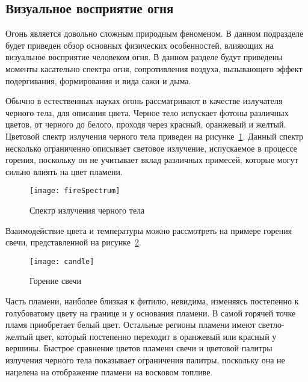 \subsection{Визуальное восприятие огня}%
\label{section:firePerception}

Огонь является довольно сложным природным феноменом. В данном подразделе будет
приведен обзор основных физических особенностей, влияющих на визуальное
восприятие человеком огня. В данном разделе будут приведены моменты касательно
спектра огня, сопротивления воздуха, вызывающего эффект подергивания,
формирования и вида сажи и дыма.

Обычно в естественных науках огонь рассматривают в качестве излучателя черного
тела, для описания цвета. Черное тело испускает фотоны различных цветов, от
черного до белого, проходя через красный, оранжевый и желтый. Цветовой спектр
излучения черного тела приведен на рисунке~\ref{fig:fireSpectrum}. Данный спектр
несколько ограниченно описывает световое излучение, испускаемое в процессе
горения, поскольку он не учитывает вклад различных примесей, которые могут
сильно влиять на цвет пламени.
\begin{figure}[htb]
	\centering
    \texttt{[image: fireSpectrum]}
	\caption{Спектр излучения черного тела}%
    \label{fig:fireSpectrum}
\end{figure}

Взаимодействие цвета и температуры можно рассмотреть на примере горения свечи,
представленной на рисунке~\ref{fig:candle}.
\begin{figure}[htb]
	\centering
    \texttt{[image: candle]}
	\caption{Горение свечи}%
    \label{fig:candle}
\end{figure}
Часть пламени, наиболее близкая к фитилю, невидима, изменяясь постепенно к
голубоватому цвету на границе и у основания пламени. В самой горячей точке пламя
приобретает белый цвет. Остальные регионы пламени имеют светло-желтый цвет,
который постепенно переходит в оранжевый или красный у вершины. Быстрое
сравнение цветов пламени свечи и цветовой палитры излучения черного тела
показывает ограничения палитры, поскольку она не нацелена на отображение пламени
на восковом топливе.

